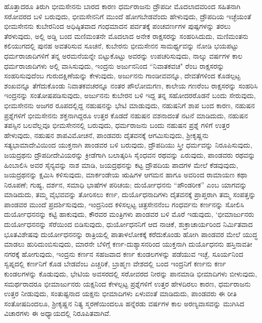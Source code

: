 ಹೊತ್ತಾದರೂ ತಿರುಗಿ ಭೀಮಸೇನನು ಬಾರದ ಕಾರಣ ಧರ್ಮರಾಜನು ದ್ರೌಪದೀ ಮೊದಲಾದವರಿಂದ ಸಹಿತನಾಗಿ ಸರೋವರದ ಬಳಿ ಬರುವುದು, ಭೀಮಸೇನನಿಗೆ ಮುಂದೆ ಹೋಗಬೇಡವೆಂದು ಹೇಳುವುದು, ದ್ರೌಪದಿಯ ಇಚ್ಛೆಯಂತೆ ಭೀಮಸೇನನು ಕುಬೇರನಿಂದ ಅಧಿಷ್ಠಿತವಾದ ಗಂಧಮಾದನ ಪರ್ವತಕ್ಕೆ ಪಂಚವರ್ಣಗಳ ಪುಷ್ಪಗಳನ್ನು ತರಲು ತೆರಳುವುದು, ಅಲ್ಲಿ ಅಡ್ಡಿ ಬಂದ ಮಣಿಮಂತನೇ ಮೊದಲಾದ ಅನೇಕ ರಾಕ್ಷಸರನ್ನು ಸಂಹರಿಸಿದುದು, ಮಣಿಮಂತನು ಕಲಿಯುಗದಲ್ಲಿ ಪುನಹ ಅವತರಿಸುವ ಸೂಚನೆ, ಕುಬೇರನು ಭೀಮಸೇನನ ಸಾಮರ್ಥ್ಯವನ್ನು ನೋಡಿ ಭಯಪಟ್ಟು ಧರ್ಮರಾಜಾದಿಗಳಿಗೆ ತನ್ನ ಅರಮನೆಯನ್ನೇ ಬಿಟ್ಟುಕೊಟ್ಟು ಅವರನ್ನು ಉಪಚರಿಸುವುದು, ನಾಲ್ಕು ವರ್ಷಗಳ ಕಾಲ ಧರ್ಮರಾಜಾದಿಗಳು ಅಲ್ಲಿ ವಾಸಿಸುವುದು, ಇಂದ್ರನು ಅರ್ಜುನನಿಂದ “ನಿವಾತಕವಚ" ರೆಂಬ ರಾಕ್ಷಸರನ್ನು ಸಂಹರಿಸುವುದೆಂಬ ಗುರುದಕ್ಷಿಣೆಯನ್ನು ಕೇಳುವುದು, ಅರ್ಜುನನು ಗಾಂಡೀವವನ್ನೂ, ದೇವತೆಗಳಿಂದ ಕೊಡಲ್ಪಟ್ಟ ಶಂಖವನ್ನೂ ತೆಗೆದುಕೊಂಡು ನಿವಾತಕವಚರನ್ನೂ ನಂತರ ಪೌಲೋಮಗಣ, ಕಾಲೇಯ ಗಣರೆಂಬ ರಾಕ್ಷಸರನ್ನು ಸಂಹರಿಸಿ ಇಂದ್ರನನ್ನು ಸಂತೋಷಪಡಿಸುವುದು, ಅರ್ಜುನನು ಕುಬೇರನ ಬಳಿ ಇದ್ದ ತನ್ನ ಸಹೋದರರೊಡನೆ ಬಂದು ಸೇರುವುದು, ಭೀಮಸೇನನು ಅಜಗರ ರೂಪದಲ್ಲಿದ್ದ ನಹುಷನನ್ನು ಭೇಟಿ ಮಾಡುವುದು, ನಹುಷನಿಗೆ ಶಾಪ ಬಂದ ಕಾರಣ, ನಹುಷನ ಪ್ರಶ್ನೆಗಳಿಗೆ ಭೀಮಸೇನನು ಶಕ್ತನಾಗಿದ್ದರೂ ಉತ್ತರ ಕೊಡದೆ ನಹುಷನ ವಶನಾದಂತೆ ನಟನೆ ಮಾಡಿದುದು, ನಹುಷನ ತಪಸ್ಸಿನ ಬಲವೆಲ್ಲವೂ ಭೀಮಸೇನನಲ್ಲಿ ಬರುವುದು, ಧರ್ಮರಾಜನು ಬಂದು ನಹುಷನ ಪ್ರಶ್ನೆ ಗಳಿಗೆ ಉತ್ತರ ಹೇಳುವುದು, ನಹುಷನ ಶಾಪವಿಮೋಚನೆ, ಪಾಂಡವರು ದೈತವನಕ್ಕೆ ಆಗಮಿಸುವುದು, ಶ‍್ರೀಕೃಷ್ಣನು ಸತ್ಯಭಾಮಾದೇವಿಯಿಂದ ಯುಕ್ತನಾಗಿ ಪಾಂಡವರ ಬಳಿ ಬರುವುದು, ದ್ರೌಪದಿಯು ಸ್ತ್ರೀ ಧರ್ಮವನ್ನು ನಿರೂಪಿಸುವುದು, ಜಯದ್ರಥನು ದ್ರೌಪದೀದೇವಿಯರನ್ನು ಕ್ರೀಡೆಗಾಗಿ ಬಲಾತ್ಕರಿಸಿ ಸೈಂಧವನ ರಥವನ್ನು ಏರುವುದು, ಪಾಂಡವರು ರಥವನ್ನು ಹಿಂಬಾಲಿಸಿ ಅವರ ಸೈನ್ಯವನ್ನು ನಾಶ ಮಾಡಿ, ಜಯದ್ರಥನನ್ನು ಕಟ್ಟ ದ್ರೌಪದಿಯ ಪಾದಗಳ ಮೇಲೆ ಕೆಡವುವುದು, ಜಯದ್ರಥನನ್ನು ಕ್ಷಮಿಸಿ ಕಳಿಸುವುದು, ಮಾರ್ಕಂಡೇಯ ಋಷಿಗಳ ಆಗಮನ ಹಾಗೂ ಅವರಿಂದ ರಾಮಾಯಣ ಕಥಾ ನಿರೂಪಣೆ; ಗುಹ್ಯ, ದರ್ಶನ, ಸಮಾಧಿ ಭಾಷೆಗಳ ಪರಿಚಯ; ದುರ್ಯೋಧನನು “ಪೌಂಡರೀಕ” ಎಂಬ ಯಾಗವನ್ನು ಮಾಡಿದುದು, ತಮ್ಮ ವೈಭವವನ್ನು ತೋರಿಸಲು ಕರ್ಣ, ದುರ್ಯೊಧನಾದಿಗಳು ದೈತವನಕ್ಕೆ ಪ್ರಾಪ್ತರಾಗಿ ತಮ್ಮ ಸಂಪತ್ತನ್ನು ಪಾಂಡವರ ಮುಂದೆ ಪ್ರದರ್ಶಿಸುವುದು, ಇಂದ್ರನಿಂದ ಕಳಿಸಲ್ಪಟ್ಟ ಚಿತ್ರಸೇನನೆಂಬ ಗಂಧರ್ವನು ಕರ್ಣನನ್ನು ಸೋಲಿಸಿ ದುರ್ಯೋಧನನನ್ನು ಕಟ್ಟಿ ಹಾಕುವುದು, ಕೌರವರ ಮಂತ್ರಿಗಳು ಪಾಂಡವರ ಬಳಿ ಮೊರೆ ಇಡುವುದು, `ಭೀಮಾರ್ಜುನರು ದುರ್ಯೋಧನನನ್ನು ಸೆರೆಯಿಂದ ಬಿಡಿಸುವುದು, ಧುರ್ಯೋಧನನಿಗೆ ಆದ ನಾಚಿಕೆ, ಶುಕ್ರಾಚಾರ್ಯರಿಂದ ನಿರ್ಮಿತವಾದ ಭೂತವಿಶೇಷವು ದುರ್ಯೋಧನನನ್ನು ರಾತ್ರಿಯಲ್ಲಿ ಪಾತಾಳಲೋಕಕ್ಕೆ ಕರೆದುಕೊಂಡು ಹೋಗಿ ಪಾಂಡವರ ಮೇಲೆ ಯುದ್ಧ ಮಾಡಲು ಹುರಿದುಂಬಿಸುವುದು, ಮಾರನೇ ಬೆಳಿಗ್ಗೆ ಕರ್ಣ-ದುಶ್ಯಾಸನರಿಂದ ಯುಕ್ತನಾಗಿ ದುರ್ಯೊಧನನು ಹಸ್ತಿನಾವತೀ ನಗರಕ್ಕೆ ಹೋಗುವುದು, ಇಂದ್ರನು ಕರ್ಣನ ಸಹಜವಾದ ಕರ್ಣ ಕುಂಡಲಗಳನ್ನು ಪಡೆಯುವ ಇಚ್ಛೆ, ಸೂರ್ಯನಿಂದ ಸ್ವಪ್ನದಲ್ಲಿ ಕರ್ಣನಿಗೆ ಕೊಡ ಬೇಡವೆಂಬ ಎಚ್ಚರಿಕೆ, ಬ್ರಾಹ್ಮಣ ವೇಶದಲ್ಲಿ ಬಂದ ಇಂದ್ರನಿಗೆ ಕರ್ಣನು ಕರ್ಣ ಕುಂಡಲಗಳನ್ನು ಕೊಡುವುದು, ಭೇಟಿಯ ಅವಸರದಲ್ಲಿ ಸರೋವರದ ನೀರನ್ನು ಪಾನಮಾಡಿ ಭೀಮಾದಿಗಳು ಬೀಳುವುದು, ಸಮರ್ಥರಾದರೂ ಭೀಮಾರ್ಜುನರು ಯಕ್ಷನಿಂದ ಕೇಳಲ್ಪಟ್ಟ ಪ್ರಶ್ನೆಗಳಿಗೆ ಉತ್ತರ ಹೇಳದಿರಲು ಕಾರಣ, ಧರ್ಮರಾಜನು ಉತ್ತರ ನೀಡುವುದು, ಸಂತುಷ್ಟನಾದ ಯಕ್ಷನು ಭೀಮಾದಿಗಳು ಏಳುವಂತೆ ಮಾಡಿದುದು, ಪಾಂಡವರು ಈ ರೀತಿ ಸಂತೋಷದಿಂದಲೂ, ಶ‍್ರೀಕೃಷ್ಣನ ನಿತ್ಯ ಸ್ಮರಣೆಯಿಂದಲೂ ಹನ್ನೆರಡು ವರ್ಷಗಳ ಕಾಲ ಅರಣ್ಯವಾಸವನ್ನು ಮುಗಿಸಿದ ವಿಚಾರಗಳು ಈ ಅಧ್ಯಾಯದಲ್ಲಿ ನಿರೂಪಿತವಾಗಿವೆ.


